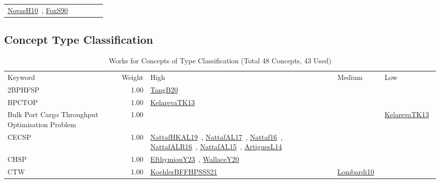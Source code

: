 {\begin{longtable}{p{3cm}r>{\raggedright\arraybackslash}p{6cm}>{\raggedright\arraybackslash}p{6cm}>{\raggedright\arraybackslash}p{8cm}}
\href{../works/NovasH10.pdf}{NovasH10}~\cite{NovasH10}, \href{../works/FoxS90.pdf}{FoxS90}~\cite{FoxS90}\\
\end{longtable}
}

\clearpage
\subsection{Concept Type Classification}
\label{sec:Classification}
\label{Classification}
{\scriptsize
\begin{longtable}{p{3cm}r>{\raggedright\arraybackslash}p{6cm}>{\raggedright\arraybackslash}p{6cm}>{\raggedright\arraybackslash}p{8cm}}
\rowcolor{white}\caption{Works for Concepts of Type Classification (Total 48 Concepts, 43 Used)}\\ \toprule
\rowcolor{white}Keyword & Weight & High & Medium & Low\\ \midrule\endhead
\bottomrule
\endfoot
\index{2BPHFSP}\index{Classification!2BPHFSP}2BPHFSP &  1.00 & \href{../works/TangB20.pdf}{TangB20}~\cite{TangB20} &  & \\
\index{BPCTOP}\index{Classification!BPCTOP}BPCTOP &  1.00 & \href{../works/KelarevaTK13.pdf}{KelarevaTK13}~\cite{KelarevaTK13} &  & \\
\index{Bulk Port Cargo Throughput Optimisation Problem}\index{Classification!Bulk Port Cargo Throughput Optimisation Problem}Bulk Port Cargo Throughput Optimisation Problem &  1.00 &  &  & \href{../works/KelarevaTK13.pdf}{KelarevaTK13}~\cite{KelarevaTK13}\\
\index{CECSP}\index{Classification!CECSP}CECSP &  1.00 & \href{../works/NattafHKAL19.pdf}{NattafHKAL19}~\cite{NattafHKAL19}, \href{../works/NattafAL17.pdf}{NattafAL17}~\cite{NattafAL17}, \href{../works/Nattaf16.pdf}{Nattaf16}~\cite{Nattaf16}, \href{../works/NattafALR16.pdf}{NattafALR16}~\cite{NattafALR16}, \href{../works/NattafAL15.pdf}{NattafAL15}~\cite{NattafAL15}, \href{../works/ArtiguesL14.pdf}{ArtiguesL14}~\cite{ArtiguesL14} &  & \\
\index{CHSP}\index{Classification!CHSP}CHSP &  1.00 & \href{../works/EfthymiouY23.pdf}{EfthymiouY23}~\cite{EfthymiouY23}, \href{../works/WallaceY20.pdf}{WallaceY20}~\cite{WallaceY20} &  & \\
\index{CTW}\index{Classification!CTW}CTW &  1.00 & \href{../works/KoehlerBFFHPSSS21.pdf}{KoehlerBFFHPSSS21}~\cite{KoehlerBFFHPSSS21} & \href{../works/Lombardi10.pdf}{Lombardi10}~\cite{Lombardi10} & \\

\end{longtable}}
